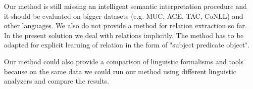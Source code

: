 \documentclass[runningheads,a4paper]{llncs}
\begin{document}
Our method is still missing an intelligent semantic interpretation procedure and it should be evaluated on bigger datasets (e.g. MUC, ACE, TAC, CoNLL) and other languages. We also do not provide a method for relation extraction so far. In the present solution we deal with relations implicitly. The method has to be adapted for explicit learning of relation in the form of "subject predicate object".

Our method could also provide a comparison of linguistic formalisms and tools because on the same data we could run our method using different linguistic analyzers and compare the results.



%
%
%
%
%
\end{document}
